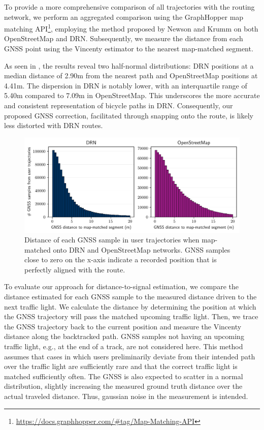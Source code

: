 To provide a more comprehensive comparison of all trajectories with the routing network, we perform an aggregated comparison using the GraphHopper map matching API\footnote{\url{https://docs.graphhopper.com/\#tag/Map-Matching-API}}, employing the method proposed by Newson and Krumm \cite{newson_hidden_2009} on both OpenStreetMap and DRN. Subsequently, we measure the distance from each GNSS point using the Vincenty estimator to the nearest map-matched segment.

As seen in , the results reveal two half-normal distributions: DRN positions at a median distance of 2.90m from the nearest path and OpenStreetMap positions at 4.41m. The dispersion in DRN is notably lower, with an interquartile range of 5.40m compared to 7.09m in OpenStreetMap. This underscores the more accurate and consistent representation of bicycle paths in DRN. Consequently, our proposed GNSS correction, facilitated through snapping onto the route, is likely less distorted with DRN routes.

\begin{figure}[t]
\centering 
\includegraphics[width=\linewidth]{images/routing-gnss-mapmatching-distribution.pdf}
\caption{Distance of each GNSS sample in user trajectories when map-matched onto DRN and OpenStreetMap networks. GNSS samples close to zero on the x-axis indicate a recorded position that is perfectly aligned with the route.}
\label{fig:routing-gnss-mapmatching-distribution}
\end{figure}

To evaluate our approach for distance-to-signal estimation, we compare the distance estimated for each GNSS sample to the measured distance driven to the next traffic light. We calculate the distance by determining the position at which the GNSS trajectory will pass the matched upcoming traffic light. Then, we trace the GNSS trajectory back to the current position and measure the Vincenty distance along the backtracked path. GNSS samples not having an upcoming traffic light, e.g., at the end of a track, are not considered here. This method assumes that cases in which users preliminarily deviate from their intended path over the traffic light are sufficiently rare and that the correct traffic light is matched sufficiently often. The GNSS is also expected to scatter in a normal distribution, slightly increasing the measured ground truth distance over the actual traveled distance. Thus, gaussian noise in the measurement is intended.

